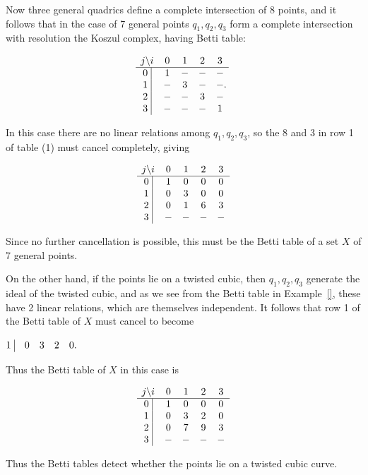 \begin{example}
Now three general quadrics define a complete intersection of 8 points, and it follows that in the case of 7 general points $q_{1},q_{2},q_{3}$ form a complete intersection with resolution the Koszul complex, having Betti table:
\begin{small}
$$
\begin{matrix}
j \backslash i &0&1&2&3\\ \hline
\text{0 }\vline &1&-&-&-\\
\text{1 }\vline &-&3&-&-\\
\text{2 }\vline &-&-&3&-\\
\text{3 }\vline &-&-&-&1\\
\end{matrix}.
$$
\end{small}
In this case there are no linear relations among $q_{1},q_{2},q_{3}$, so the 8 and 3 in row 1 of table (1) must 
cancel completely, giving
\begin{small}
$$
\begin{matrix}
j \backslash i &0&1&2&3\\ \hline
\text{0 }\vline &1&0&0&0\\
\text{1 }\vline &0&3&0&0\\
\text{2 }\vline &0&1&6&3\\
\text{3 }\vline &-&-&-&-\\
\end{matrix}
$$
\end{small}
Since no further cancellation is possible, this must be the Betti table of a  set $X$ of 7 general points.

On the other hand, if the points lie on a twisted cubic, then $q_{1}, q_{2}, q_{3}$ generate the ideal of the twisted cubic, and as we  see from the Betti table in Example~\ref{}, these have 2 linear relations, which are themselves independent. It follows that row 1 of the Betti table of $X$ must cancel to become 
\begin{small}
 $
\begin{matrix}
\text{1 }\vline &0&3&2&0\\
\end{matrix}.
$
\end{small}
Thus the Betti table of $X$ in this case is
\begin{small}
$$
\begin{matrix}
j \backslash i &0&1&2&3\\ \hline
\text{0 }\vline &1&0&0&0\\
\text{1 }\vline &0&3&2&0\\
\text{2 }\vline &0&7&9&3\\
\text{3 }\vline &-&-&-&-\\
\end{matrix}
$$
\end{small}

\end{example}
Thus the Betti tables detect whether the points lie on a twisted cubic curve.


